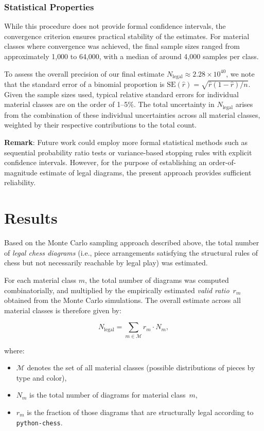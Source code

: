 \documentclass[12pt]{article}
\begin{document}
\subsubsection{Statistical Properties}

While this procedure does not provide formal confidence intervals, the convergence criterion ensures practical stability of the estimates. For material classes where convergence was achieved, the final sample sizes ranged from approximately 1{,}000 to 64{,}000, with a median of around 4{,}000 samples per class.

To assess the overall precision of our final estimate $N_{\text{legal}} \approx 2.28 \times 10^{40}$, we note that the standard error of a binomial proportion is $\text{SE}(\hat{r}) = \sqrt{\hat{r}(1-\hat{r})/n}$. Given the sample sizes used, typical relative standard errors for individual material classes are on the order of 1--5\%. The total uncertainty in $N_{\text{legal}}$ arises from the combination of these individual uncertainties across all material classes, weighted by their respective contributions to the total count.

\textbf{Remark}: Future work could employ more formal statistical methods such as sequential probability ratio tests or variance-based stopping rules with explicit confidence intervals. However, for the purpose of establishing an order-of-magnitude estimate of legal diagrams, the present approach provides sufficient reliability.

\section{Results}

Based on the Monte Carlo sampling approach described above, the total number of \emph{legal chess diagrams} (i.e., piece arrangements satisfying the structural rules of chess but not necessarily reachable by legal play) was estimated.

For each material class $m$, the total number of diagrams was computed combinatorially, and multiplied by the empirically estimated \emph{valid ratio}~$r_m$ obtained from the Monte Carlo simulations.  
The overall estimate across all material classes is therefore given by:

\[
N_{\text{legal}} = \sum_{m \in \mathcal{M}} r_m \cdot N_m,
\]

where:
\begin{itemize}
    \item $\mathcal{M}$ denotes the set of all material classes (possible distributions of pieces by type and color),
    \item $N_m$ is the total number of diagrams for material class~$m$,
    \item $r_m$ is the fraction of those diagrams that are structurally legal according to \texttt{python-chess}.
\end{itemize}
\end{document}
